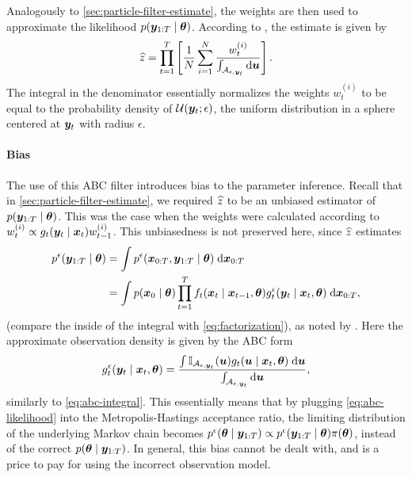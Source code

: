 Analogously to \autoref{sec:particle-filter-estimate}, the weights are then used to approximate the likelihood $p(\bm{y}_{1:T} \mid \bm{\theta})$. According to \cite{jasra-time-series}, the estimate is given by
\begin{equation} \label{eq:abc-likelihood}
\widehat{z} = \prod_{t=1}^T \left[\frac{1}{N} \sum_{i=1}^N \frac{w_t^{(i)}}{\int_{\mathcal{A}_{\epsilon, \bm{y}_t}} \mathrm{d}{\bm{u}}} \right].
\end{equation}
The integral in the denominator essentially normalizes the weights $w_t^{(i)}$ to be equal to the probability density of $\mathcal{U}(\bm{y}_t; \epsilon)$, the uniform distribution in a sphere centered at $\bm{y}_t$ with radius $\epsilon$.

\paragraph{Bias}
The use of this ABC filter introduces bias to the parameter inference. Recall that in \autoref{sec:particle-filter-estimate}, we required $\widehat{z}$ to be an unbiased estimator of $p(\bm{y}_{1:T} \mid \bm{\theta})$. This was the case when the weights were calculated according to $w_t^{(i)} \propto g_t(\bm{y}_t \mid \bm{x}_t) w_{t-1}^{(i)}$. This unbiasedness is not preserved here, since $\widehat{z}$ estimates
\begin{equation*}
\begin{split}
p^\epsilon(\bm{y}_{1:T} \mid \bm{\theta}) &= \int p^\epsilon(\bm{x}_{0:T}, \bm{y}_{1:T} \mid \bm{\theta}) \; \mathrm{d}{\bm{x}_{0:T}} \\
&= \int p(\bm{x}_0 \mid \bm{\theta}) \prod_{t=1}^T f_t(\bm{x}_t \mid \bm{x}_{t-1}, \bm{\theta}) g_t^\epsilon(\bm{y}_t \mid \bm{x}_t, \bm{\theta}) \; \mathrm{d}{\bm{x}_{0:T}},
\end{split}
\end{equation*}
(compare the inside of the integral with \eqref{eq:factorization}), as noted by \cite{jasra-time-series}. Here the approximate observation density is given by the ABC form
\begin{equation*}
g_t^\epsilon(\bm{y}_t \mid \bm{x}_t, \bm{\theta}) = \frac{\int \mathbb{I}_{\mathcal{A}_{\epsilon, \bm{y}_t}}(\bm{u}) g_t(\bm{u} \mid \bm{x}_t, \bm{\theta}) \; \mathrm{d}{\bm{u}}}{\int_{\mathcal{A}_{\epsilon, \bm{y}_t}} \mathrm{d}{\bm{u}}},
\end{equation*}
similarly to \eqref{eq:abc-integral}. This essentially means that by plugging \eqref{eq:abc-likelihood} into the Metropolis-Hastings acceptance ratio, the limiting distribution of the underlying Markov chain becomes $p^\epsilon(\bm{\theta} \mid \bm{y}_{1:T}) \propto p^\epsilon(\bm{y}_{1:T} \mid \bm{\theta}) \pi(\bm{\theta})$, instead of the correct $p(\bm{\theta} \mid \bm{y}_{1:T})$. In general, this bias cannot be dealt with, and is a price to pay for using the incorrect observation model.

